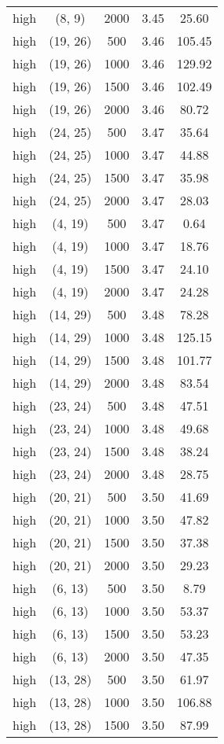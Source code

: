 \begin{tabular}{c c c c c}
high & (8, 9) &  2000 & 3.45 & 25.60 \\
high & (19, 26) &  500 & 3.46 & 105.45 \\
high & (19, 26) &  1000 & 3.46 & 129.92 \\
high & (19, 26) &  1500 & 3.46 & 102.49 \\
high & (19, 26) &  2000 & 3.46 & 80.72 \\
high & (24, 25) &  500 & 3.47 & 35.64 \\
high & (24, 25) &  1000 & 3.47 & 44.88 \\
high & (24, 25) &  1500 & 3.47 & 35.98 \\
high & (24, 25) &  2000 & 3.47 & 28.03 \\
high & (4, 19) &  500 & 3.47 & 0.64 \\
high & (4, 19) &  1000 & 3.47 & 18.76 \\
high & (4, 19) &  1500 & 3.47 & 24.10 \\
high & (4, 19) &  2000 & 3.47 & 24.28 \\
high & (14, 29) &  500 & 3.48 & 78.28 \\
high & (14, 29) &  1000 & 3.48 & 125.15 \\
high & (14, 29) &  1500 & 3.48 & 101.77 \\
high & (14, 29) &  2000 & 3.48 & 83.54 \\
high & (23, 24) &  500 & 3.48 & 47.51 \\
high & (23, 24) &  1000 & 3.48 & 49.68 \\
high & (23, 24) &  1500 & 3.48 & 38.24 \\
high & (23, 24) &  2000 & 3.48 & 28.75 \\
high & (20, 21) &  500 & 3.50 & 41.69 \\
high & (20, 21) &  1000 & 3.50 & 47.82 \\
high & (20, 21) &  1500 & 3.50 & 37.38 \\
high & (20, 21) &  2000 & 3.50 & 29.23 \\
high & (6, 13) &  500 & 3.50 & 8.79 \\
high & (6, 13) &  1000 & 3.50 & 53.37 \\
high & (6, 13) &  1500 & 3.50 & 53.23 \\
high & (6, 13) &  2000 & 3.50 & 47.35 \\
high & (13, 28) &  500 & 3.50 & 61.97 \\
high & (13, 28) &  1000 & 3.50 & 106.88 \\
high & (13, 28) &  1500 & 3.50 & 87.99 \\

\end{tabular}
